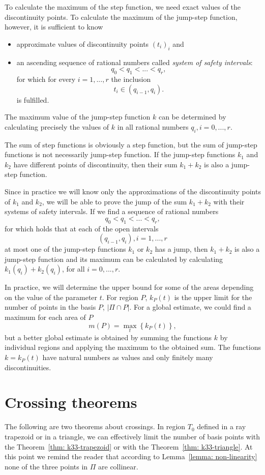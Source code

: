 To calculate the maximum of the step function, we need exact values of the discontinuity points. To calculate the maximum of the jump-step function, however, it is sufficient to know
\begin{itemize}
\item approximate values of discontinuity points $ (t_{i})_{i} $ and
\item an ascending sequence of rational numbers called \textit{system of safety intervals}:
$$
  q_{0} < q_{1} < ... < q_{r},
$$
for which for every $ i = 1, ..., r $ the inclusion
$$
  t_{i} \in (q_{i-1}, q_{i}).
$$
is fulfilled.
\end{itemize}

The maximum value of the jump-step  function $ k $ can be determined by calculating precisely the values of $k$ in all rational numbers $ q_{i}, i = 0, ..., r $.

The sum of step functions is obviously a step function, but the sum of jump-step functions is not necessarily jump-step function. If the jump-step functions $ k_{1} $ and $k_{2}$ have different points of discontinuity, then their sum $ k_{1} + k_{2} $ is also a jump-step function.

Since in practice we will know only the approximations of the discontinuity points of $ k_{1} $ and $ k_{2} $, we will be able to prove the jump of the sum $ k_{1} + k_{2} $ with their systems of safety intervals. If we find a sequence of rational numbers
$$ q_{0} <q_{1} <... <q_{r}, $$
for which holds that at each of the open intervals
$$ (q_{i-1}, q_{i}), i = 1, ..., r $$
at most one of the jump-step functions $ k_{1} $ or $ k_{2} $ has a jump, then $ k_{1} + k_{2} $ is also a jump-step function and its maximum can be calculated by calculating $ k_{1} (q_{i}) + k_{2} (q_{i}) $, for all $ i = 0, ..., r $.

In practice, we will determine the upper bound for some of the areas depending on the value of the parameter $t$. For region $P$, $k_{P}(t)$ is the upper limit for the number of points in the basis $P$, $|\Pi \cap P|$. For a global estimate, we could find a maximum for each area of $P$
$$
m(P) = \max_{t} \left \{k_{P}(t) \right \},
$$
but a better global estimate is obtained by summing the functions $k$ by individual regions and applying the maximum to the obtained sum. The functions $k = k_{P}(t)$ have natural numbers as values and only finitely many discontinuities.


\section{Crossing theorems}
The following are two theorems about crossings. In region $T_{0}$ defined in a ray trapezoid or in a triangle, we can effectively limit the number of basis points with the Theorem~\ref{thm: k33-trapezoid} or with the Theorem~\ref{thm: k33-triangle}. At this point we remind the reader that according to Lemma~\ref{lemma: non-linearity} none of the three points in $\Pi$ are collinear.

